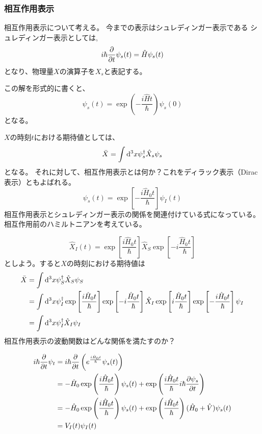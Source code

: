 \documentclass[titlepage]{ltjsarticle}
\begin{document}
\subsubsection{相互作用表示}
相互作用表示について考える。
今までの表示はシュレディンガー表示である
シュレディンガー表示としては,
\begin{equation}
  i \hbar \pdv{}{t} \psi_s(t) = \hat{H} \psi_s(t)
\end{equation}
となり、物理量\(X\)の演算子を\(X_s\)と表記する。

この解を形式的に書くと、
\begin{equation}
  \psi_s(t) = \exp \left( - \frac{i \hat{H} t}{\hbar} \right) \psi_s(0)
\end{equation}
となる。

\(X\)の時刻\(t\)における期待値としては、
\begin{equation}
  \bar{X} = \int \odif[order=3]{x} \psi^\dagger_s \hat{X}_s \psi_s
\end{equation}
となる。
それに対して、相互作用表示とは何か？これをディラック表示（Dirac表示）ともよばれる。
\begin{equation}
  \psi_s(t) = \exp\left[ -\frac{i \hat{H}_0 t}{\hbar} \right]\psi_I(t)
\end{equation}
相互作用表示とシュレディンガー表示の関係を関連付けている式になっている。相互作用前のハミルトニアンを考えている。

\begin{equation}
  \hat{X}_I(t) = \exp\left[ \frac{i \hat{H}_0 t}{\hbar} \right]\hat{X}_S \exp \left[ -i \frac{\hat{H}_0 t}{\hbar} \right]
\end{equation}
としよう。すると\(X\)の時刻における期待値は
\begin{align}
  \bar{X} &  = \int \odif[order=3]{x} \psi^\dagger_S \hat{X}_S \psi_S\\
  & = \int \odif[order=3]{x} \psi^\dagger_I \exp\left[ \frac{i \hat{H}_0 t}{\hbar} \right]\exp \left[ -i \frac{\hat{H}_0 t}{\hbar} \right] \hat{X}_I \exp \left[ i \frac{\hat{H}_0 t}{\hbar} \right] \exp\left[ -\frac{i \hat{H}_0 t}{\hbar} \right]\psi_I\\
  & = \int \odif[order=3]{x} \psi^\dagger_I \hat{X}_I \psi_I
\end{align}
相互作用表示の波動関数はどんな関係を満たすのか？

\begin{align}
  i \hbar \pdv{}{t} \psi_t & = i \hbar \pdv{}{t} \left( e^{\frac{i \hat{H}_0 t}{\hbar}} \psi_s(t) \right)\\
  & = - \hat{H}_0 \exp \left( \frac{i  \hat{H}_0 t}{\hbar} \right)\psi_s(t) + \exp\left( \frac{i \hat{H}_0 t}{\hbar} i \hbar \pdv{\psi_s}{t} \right)\\
  & = - \hat{H}_0 \exp \left( \frac{i  \hat{H}_0 t}{\hbar} \right)\psi_s(t) + \exp\left( \frac{i \hat{H}_0 t}{\hbar}\right)(\hat{H}_0 + \hat{V})\psi_s(t)\\
  & = V_I(t) \psi_I(t) 
\end{align}
\end{document}
